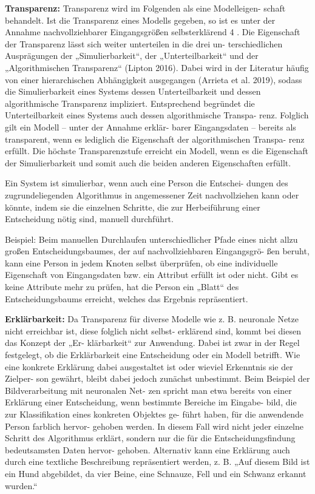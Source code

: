 \documentclass[11pt,a4paper]{article}
\numberwithin{equation}{section}
\begin{document}
	\noindent \textbf{Transparenz: }
	Transparenz wird im Folgenden als eine Modelleigen-
	schaft behandelt. Ist die Transparenz eines Modells
	gegeben, so ist es unter der Annahme nachvollziehbarer
	Eingangsgrößen selbsterklärend 4 . Die Eigenschaft der
	Transparenz lässt sich weiter unterteilen in die drei un-
	terschiedlichen Ausprägungen der „Simulierbarkeit“, der
	„Unterteilbarkeit“ und der „Algorithmischen Transparenz“
	(Lipton 2016). Dabei wird in der Literatur häufig von einer
	hierarchischen Abhängigkeit ausgegangen (Arrieta et al.
	2019), sodass die Simulierbarkeit eines Systems dessen
	Unterteilbarkeit und dessen algorithmische Transparenz
	impliziert. Entsprechend begründet die Unterteilbarkeit
	eines Systems auch dessen algorithmische Transpa-
	renz. Folglich gilt ein Modell – unter der Annahme erklär-
	barer Eingangsdaten – bereits als transparent, wenn es
	lediglich die Eigenschaft der algorithmischen Transpa-
	renz erfüllt. Die höchste Transparenzstufe erreicht ein
	Modell, wenn es die Eigenschaft der Simulierbarkeit und
	somit auch die beiden anderen
	Eigenschaften erfüllt.
	
	Ein System ist simulierbar, wenn
	auch eine Person die Entschei-
	dungen des zugrundeliegenden
	Algorithmus in angemessener
	Zeit nachvollziehen kann oder
	könnte, indem sie die einzelnen
	Schritte, die zur Herbeiführung
	einer Entscheidung nötig sind,
	manuell durchführt.	
	
	Beispiel: Beim manuellen
	Durchlaufen unterschiedlicher
	Pfade eines nicht allzu großen
	Entscheidungsbaumes, der auf
	nachvollziehbaren Eingangsgrö-
	ßen beruht, kann eine Person in
	jedem Knoten selbst überprüfen,
	ob eine individuelle Eigenschaft
	von Eingangsdaten bzw. ein Attribut erfüllt ist oder nicht.
	Gibt es keine Attribute mehr zu prüfen, hat die Person
	ein „Blatt“ des Entscheidungsbaums erreicht, welches
	das Ergebnis repräsentiert. 
	
	\noindent \textbf{Erklärbarkeit: }Da Transparenz für diverse Modelle wie z. B. neuronale
	Netze nicht erreichbar ist, diese folglich nicht selbst-
	erklärend sind, kommt bei diesen das Konzept der „Er-
	klärbarkeit“ zur Anwendung. Dabei ist zwar in der Regel
	festgelegt, ob die Erklärbarkeit eine Entscheidung oder
	ein Modell betrifft. Wie eine konkrete Erklärung dabei
	ausgestaltet ist oder wieviel Erkenntnis sie der Zielper-
	son gewährt, bleibt dabei jedoch zunächst unbestimmt.
	Beim Beispiel der Bildverarbeitung mit neuronalen Net-
	zen spricht man etwa bereits von einer Erklärung einer
	Entscheidung, wenn bestimmte Bereiche im Eingabe-
	bild, die zur Klassifikation eines konkreten Objektes ge-
	führt haben, für die anwendende Person farblich hervor-
	gehoben werden. In diesem Fall wird nicht jeder einzelne
	Schritt des Algorithmus erklärt, sondern nur die für die
	Entscheidungsfindung bedeutsamsten Daten hervor-
	gehoben. Alternativ kann eine Erklärung auch durch eine
	textliche Beschreibung repräsentiert werden, z. B. „Auf
	diesem Bild ist ein Hund abgebildet, da vier Beine, eine
	Schnauze, Fell und ein Schwanz erkannt wurden.“
	
\end{document}
